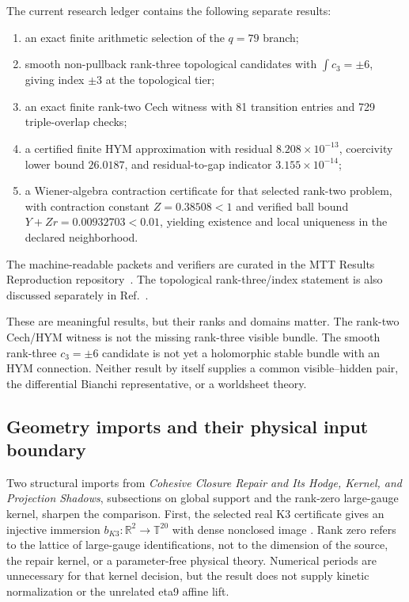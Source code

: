 \documentclass[11pt]{article}
\theoremstyle{definition}
\theoremstyle{remark}
\begin{document}
The current research ledger contains the following separate results:
\begin{enumerate}[leftmargin=1.6em]
\item an exact finite arithmetic selection of the \(q=79\) branch;
\item smooth non-pullback rank-three topological candidates with
      \(\int c_3=\pm6\), giving index \(\pm3\) at the topological tier;
\item an exact finite rank-two Cech witness with 81 transition entries and
      729 triple-overlap checks;
\item a certified finite HYM approximation with residual
      \(8.208\times10^{-13}\), coercivity lower bound \(26.0187\), and
      residual-to-gap indicator \(3.155\times10^{-14}\);
\item a Wiener-algebra contraction certificate for that selected rank-two
      problem, with contraction constant \(Z=0.38508<1\) and verified ball
      bound \(Y+Zr=0.00932703<0.01\), yielding existence and local uniqueness
      in the declared neighborhood.
\end{enumerate}
The machine-readable packets and verifiers are curated in the MTT Results
Reproduction repository~\cite{MTTResultsRepro}.  The topological
rank-three/index statement is also discussed separately in
Ref.~\cite{NeroTopology}.

These are meaningful results, but their ranks and domains matter.  The
rank-two Cech/HYM witness is not the missing rank-three visible bundle.
The smooth rank-three \(c_3=\pm6\) candidate is not yet a holomorphic stable
bundle with an HYM connection.  Neither result by itself supplies a common
visible--hidden pair, the differential Bianchi representative, or a worldsheet
theory.

\subsection{Geometry imports and their physical input boundary}
\label{sec:geometry-consumers}

Two structural imports from \emph{Cohesive Closure Repair and Its Hodge,
Kernel, and Projection Shadows}, subsections on global support and the
rank-zero large-gauge kernel, sharpen the comparison. First, the selected
real K3 certificate gives an injective immersion
\(b_{K3}:\mathbb R^2\to\mathbb T^{20}\) with dense nonclosed image
\cite{FluxBK3}. Rank zero refers to the lattice of large-gauge
identifications, not to the dimension of the source, the repair kernel,
or a parameter-free physical theory. Numerical periods are unnecessary for
that kernel decision, but the result does not supply kinetic normalization
or the unrelated eta9 affine lift.
\end{document}
